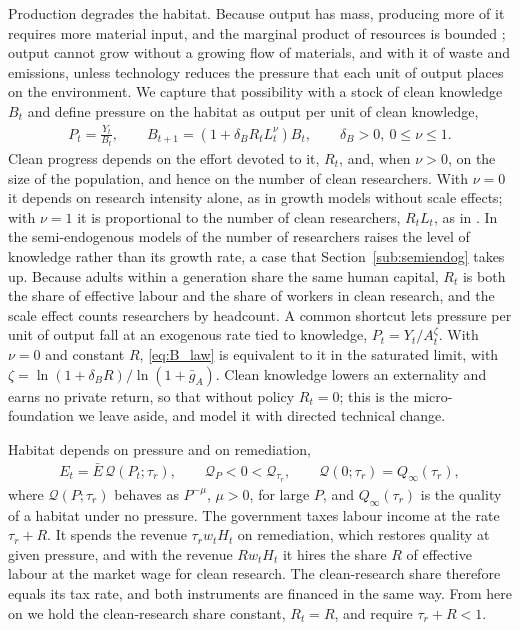 \documentclass[11pt]{article}
\begin{document}
Production degrades the habitat. Because output has mass, producing more of it requires more material
input, and the marginal product of resources is bounded \citep{DZHUMASHEV2024}; output cannot grow
without a growing flow of materials, and with it of waste and emissions, unless technology reduces the
pressure that each unit of output places on the environment. We capture that possibility with a stock of
clean knowledge $B_t$ and define pressure on the habitat as output per unit of clean knowledge,
\begin{align}
P_t=\frac{Y_t}{B_t},
\qquad
B_{t+1}=\left(1+\delta_B R_tL_t^{\nu}\right)B_t,
\qquad \delta_B>0,\ 0\le\nu\le1 .
\label{eq:B_law}
\end{align}
Clean progress depends on the effort devoted to it, $R_t$, and, when $\nu>0$, on the size of the
population, and hence on the number of clean researchers. With $\nu=0$ it depends on research intensity alone, as in
growth models without scale effects; with $\nu=1$ it is proportional to the number of clean
researchers, $R_tL_t$, as in \citet{romer1990}. In the semi-endogenous models of \citet{jones1995} the
number of researchers raises the level of knowledge rather than its growth rate, a case that
Section~\ref{sub:semiendog} takes up. Because
adults within a generation share the same human capital, $R_t$ is both the share of effective labour
and the share of workers in clean research, and the scale effect counts researchers by headcount.
A common shortcut lets pressure per unit of output fall at an exogenous rate tied to knowledge,
$P_t=Y_t/A_t^{\zeta}$. With $\nu=0$ and constant $R$, \eqref{eq:B_law} is equivalent to it in the
saturated limit, with $\zeta=\ln(1+\delta_BR)/\ln(1+\bar g_A)$. Clean knowledge lowers an externality and earns no private return, so that without policy
$R_t=0$; this is the micro-foundation we leave aside, and \citet{beulmann2025} model it with directed
technical change.

Habitat depends on pressure and on remediation,
\begin{align}
E_t=\bar E\,\mathcal{Q}(P_t;\tau_r),
\qquad \mathcal{Q}_P<0<\mathcal{Q}_{\tau_r},
\qquad \mathcal{Q}(0;\tau_r)=Q_\infty(\tau_r),
\label{eq:pressure}
\end{align}
where $\mathcal{Q}(P;\tau_r)$ behaves as $P^{-\mu}$, $\mu>0$, for large $P$, and $Q_\infty(\tau_r)$ is the
quality of a habitat under no pressure. The government taxes labour income at the rate $\tau_r+R$. It
spends the revenue $\tau_r w_tH_t$ on remediation, which restores quality at given pressure, and with the
revenue $Rw_tH_t$ it hires the share $R$ of effective labour at the market wage for clean research. The
clean-research share therefore equals its tax rate, and both instruments are financed in the same way.
From here on we hold the clean-research share constant, $R_t=R$, and require $\tau_r+R<1$.
\end{document}
